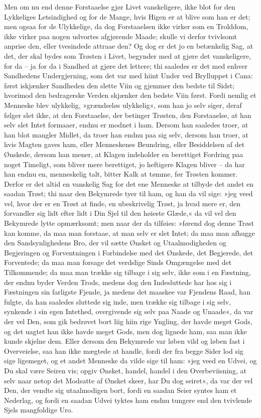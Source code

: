 \documentclass[12pt,a4paper]{article}
\begin{document}
Men om nu end denne Forstaaelse gjør Livet vanskeligere, ikke blot for den Lykkeliges Letsindighed og for de Mange, hvis Higen er at blive som han er det; men ogsaa for de Ulykkelige, da dog Forstaaelsen ikke virker som en Trolddom, ikke virker paa nogen udvortes afgjørende Maade; skulle vi derfor tvivlsomt anprise den, eller tvesindede attraae den? Og dog er det jo en betænkelig Sag, at det, der skal bydes som Trøsten i Livet, begynder med at gjøre det vanskeligere, for da – ja for da i Sandhed at gjøre det lettere; thi saaledes er det med enhver Sandhedens Undergjerning, som det var med hiint Under ved Brylluppet i Cana: først iskjænker Sandheden den slette Viin og gjemmer den bedste til Sidst; hvorimod den bedragerske Verden skjænker den bedste Viin først. Fordi nemlig et Menneske blev ulykkelig, »grændseløs ulykkelig«, som han jo selv siger, deraf følger slet ikke, at den Forstaaelse, der betinger Trøsten, den Forstaaelse, at han selv slet Intet formaaer, endnu er modnet i ham. Dersom han saaledes troer, at han blot mangler Midlet, da troer han endnu paa sig selv, dersom han troer, at hvis Magten gaves ham, eller Menneskenes Beundring, eller Besiddelsen af det Ønskede, dersom han mener, at Klagen indeholder en berettiget Fordring paa noget Timeligt, som bliver mere berettiget, jo heftigere Klagen bliver – da har han endnu en, menneskelig talt, bitter Kalk at tømme, før Trøsten kommer. Derfor er det altid en vanskelig Sag for det ene Menneske at tilbyde det andet en saadan Trøst; thi naar den Bekymrede tyer til ham, og han da vil sige: »jeg veed vel, hvor der er en Trøst at finde, en ubeskrivelig Trøst, ja hvad mere er, den forvandler sig lidt efter lidt i Din Sjel til den høieste Glæde,« da vil vel den Bekymrede lytte opmærksomt; men naar der da tilføies: »førend dog denne Trøst kan komme, da maa man forstaae, at man selv er slet Intet; da maa man afhugge den Sandsynlighedens Bro, der vil sætte Ønsket og Utaalmodigheden og Begjeringen og Forventningen i Forbindelse med det Ønskede, det Begjerede, det Forventede; da maa man forsage det verdslige Sinds Omgængelse med det Tilkommende; da maa man trække sig tilbage i sig selv, ikke som i en Fæstning, der endnu byder Verden Trods, medens dog den Indesluttede har hos sig i Fæstningen sin farligste Fjende, ja medens det maaskee var Fjendens Raad, han fulgte, da han saaledes sluttede sig inde, men trække sig tilbage i sig selv, synkende i sin egen Intethed, overgivende sig selv paa Naade og Unaade«, da var der vel Den, som gik bedrøvet bort liig hiin rige Yngling, der havde meget Gods, og det uagtet han ikke havde meget Gods, men dog lignede ham, saa man ikke kunde skjelne dem. Eller dersom den Bekymrede var løben vild og løben fast i Overveielse, saa han ikke mægtede at handle, fordi der fra begge Sider lod sig sige ligemeget, og et andet Menneske da vilde sige til ham: »jeg veed en Udvei, og Du skal være Seiren vis; opgiv Ønsket, handel, handel i den Overbeviisning, at selv naar netop det Modsatte af Ønsket skeer, har Du dog seiret«, da var der vel Den, der vendte sig utaalmodigen bort, fordi en saadan Seier syntes ham et Nederlag, og fordi en saadan Udvei tyktes ham endnu tungere end den tvivlende Sjels mangfoldige Uro.
\end{document}
